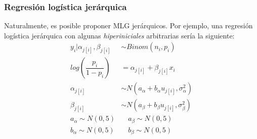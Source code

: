 \begin{table}
\centering
{}
\caption{Ejemplos esquemáticos de regresiones jerárquicas lineales. Fuente: elaboración propia.}
\label{tbl:Regr_Jer_Lineales}
\end{table}


\subsubsection*{Regresión logística jerárquica}

Naturalmente, es posible proponer MLG jerárquicos. Por ejemplo, una regresión logística jerárquica con algunas \textit{hiperiniciales} arbitrarias sería la siguiente: 
\begin{align*}
y_i|\alpha_{j[i]},\beta_{j[i]} & \sim Binom(n_i,p_i) \\
log\left(\dfrac{p_i}{1-p_i}\right) &= \alpha_{j[i]} + \beta_{j[i]} x_i  \\ 
\alpha_{j[i]} & \sim N(a_{\alpha} + b_{\alpha} u_{j[i]}, \sigma_{\alpha}^2) \\ 
\beta_{j[i]} & \sim N(a_{\beta} + b_{\beta} u_{j[i]}, \sigma_{\beta}^2) \\ 
a_{\alpha} \sim N(0,5) & \quad  a_{\beta} \sim N(0,5) \\
b_{\alpha} \sim N(0,5) & \quad  b_{\beta} \sim N(0,5) 
\end{align*}

